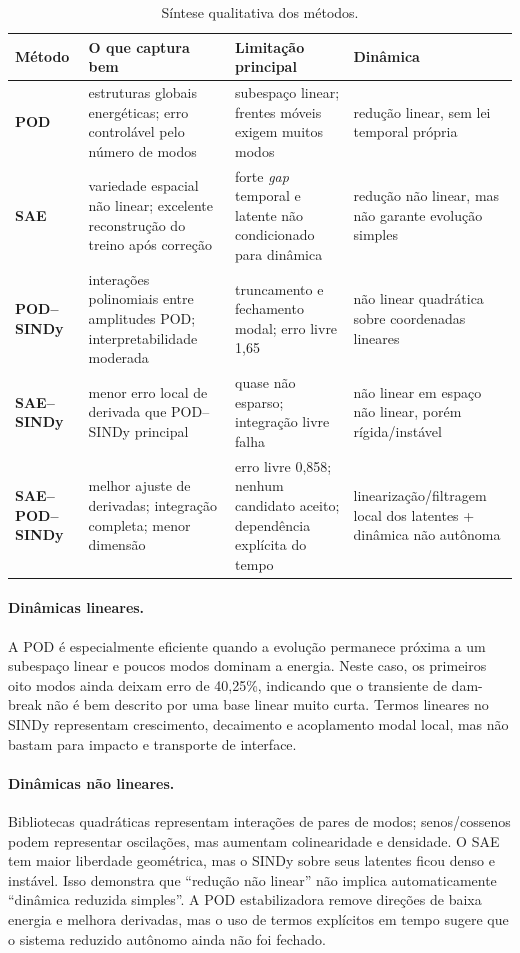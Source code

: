 \documentclass[12pt,a4paper]{article}
\begin{document}
\begin{table}[H]
\centering
\caption{Síntese qualitativa dos métodos.}
\label{tab:sintese}
\begin{tabularx}{\textwidth}{>{\bfseries}l X X X}
\toprule
Método & O que captura bem & Limitação principal & Dinâmica\\
\midrule
POD & estruturas globais energéticas; erro controlável pelo número de modos & subespaço linear; frentes móveis exigem muitos modos & redução linear, sem lei temporal própria\\
SAE & variedade espacial não linear; excelente reconstrução do treino após correção & forte \emph{gap} temporal e latente não condicionado para dinâmica & redução não linear, mas não garante evolução simples\\
POD--SINDy & interações polinomiais entre amplitudes POD; interpretabilidade moderada & truncamento e fechamento modal; erro livre 1,65 & não linear quadrática sobre coordenadas lineares\\
SAE--SINDy & menor erro local de derivada que POD--SINDy principal & quase não esparso; integração livre falha & não linear em espaço não linear, porém rígida/instável\\
SAE--POD--SINDy & melhor ajuste de derivadas; integração completa; menor dimensão & erro livre 0,858; nenhum candidato aceito; dependência explícita do tempo & linearização/filtragem local dos latentes + dinâmica não autônoma\\
\bottomrule
\end{tabularx}
\end{table}

\paragraph{Dinâmicas lineares.} A POD é especialmente eficiente quando a evolução permanece próxima a um subespaço linear e poucos modos dominam a energia. Neste caso, os primeiros oito modos ainda deixam erro de 40,25\%, indicando que o transiente de dam-break não é bem descrito por uma base linear muito curta. Termos lineares no SINDy representam crescimento, decaimento e acoplamento modal local, mas não bastam para impacto e transporte de interface.

\paragraph{Dinâmicas não lineares.} Bibliotecas quadráticas representam interações de pares de modos; senos/cossenos podem representar oscilações, mas aumentam colinearidade e densidade. O SAE tem maior liberdade geométrica, mas o SINDy sobre seus latentes ficou denso e instável. Isso demonstra que ``redução não linear'' não implica automaticamente ``dinâmica reduzida simples''. A POD estabilizadora remove direções de baixa energia e melhora derivadas, mas o uso de termos explícitos em tempo sugere que o sistema reduzido autônomo ainda não foi fechado.
\end{document}
